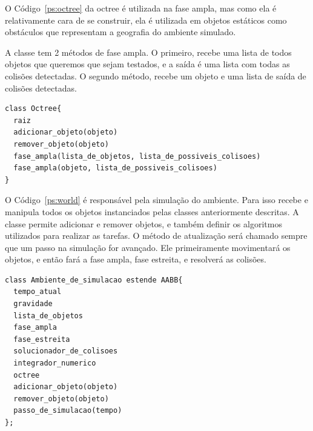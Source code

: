 O Código~\ref{ps:octree} da octree é utilizada na fase ampla, mas como ela é relativamente cara de se construir, ela é utilizada em objetos estáticos como obstáculos que representam a geografia do ambiente simulado. 

A classe tem 2 métodos de fase ampla. O primeiro, recebe uma lista de todos objetos que queremos que sejam testados, e a saída é uma lista com todas as colisões detectadas. O segundo método, recebe um objeto e uma lista de saída de colisões detectadas.

\begin{lstlisting}[frame=single,caption=Modelagem prévia para octree\label{ps:octree}]
class Octree{
  raiz
  adicionar_objeto(objeto)
  remover_objeto(objeto)
  fase_ampla(lista_de_objetos, lista_de_possiveis_colisoes)
  fase_ampla(objeto, lista_de_possiveis_colisoes)
}
\end{lstlisting}

O Código~\ref{ps:world} é responsável pela simulação do ambiente. Para isso recebe e manipula todos os objetos instanciados pelas classes anteriormente descritas. A classe permite adicionar e remover objetos, e também definir os algoritmos utilizados para realizar as tarefas.
O método de atualização será chamado sempre que um passo na simulação for avançado. Ele primeiramente movimentará os objetos, e então fará a fase ampla, fase
estreita, e resolverá as colisões.

\begin{lstlisting}[frame=single,caption=Modelagem prévia para ambiente de simulação\label{ps:world}]
class Ambiente_de_simulacao estende AABB{
  tempo_atual
  gravidade
  lista_de_objetos
  fase_ampla
  fase_estreita
  solucionador_de_colisoes
  integrador_numerico
  octree
  adicionar_objeto(objeto)
  remover_objeto(objeto)
  passo_de_simulacao(tempo)
};
\end{lstlisting}

